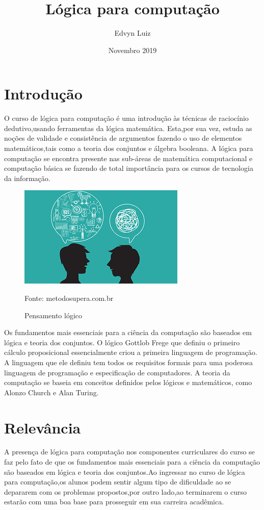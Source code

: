 \documentclass{article}
\title{Lógica para computação}
\author{Edvyn Luiz}
\date{Novembro 2019}
\begin{document}
\maketitle

\section{Introdução}
O curso de lógica para computação é uma introdução às técnicas de raciocínio dedutivo,usando ferramentas da lógica matemática. Esta,por sua vez, estuda as noções de validade e consistência de argumentos fazendo o uso de elementos matemáticos,tais como a teoria dos conjuntos e álgebra booleana. A lógica para computação se encontra presente nas sub-áreas de matemática computacional e computação básica se fazendo de total importância para os cursos de tecnologia da informação.
\citep{cinufpe2019}

\begin{figure}[h!]
\centering
\includegraphics[scale=1]{logica.png}
\caption{Pensamento lógico}
{Fonte: metodosupera.com.br}
\label{fig:logica}
\end{figure}
Os fundamentos mais essenciais para a ciência da computação são baseados em lógica e teoria dos conjuntos. O lógico Gottlob Frege que definiu o primeiro cálculo proposicional essencialmente criou a primeira linguagem de programação. A linguagem que ele definiu tem todos os requisitos formais para uma poderosa linguagem de programação e especificação de computadores. A teoria da computação se baseia em conceitos definidos pelos lógicos e matemáticos, como Alonzo Church e Alan Turing.
\cite{wikipedia2019}

\section{Relevância}
A presença de lógica para computação nos componentes curriculares do curso se faz pelo fato de que os fundamentos mais essenciais para a ciência da computação são baseados em lógica e teoria dos conjuntos.Ao ingressar no curso de lógica para computação,os alunos podem sentir algum tipo de dificuldade ao se depararem com os problemas propostos,por outro lado,ao terminarem o curso estarão com uma boa base para prosseguir em sua carreira acadêmica.
\citep{ufpe2019}
\citep{cinufpe2019}
\end{document}
